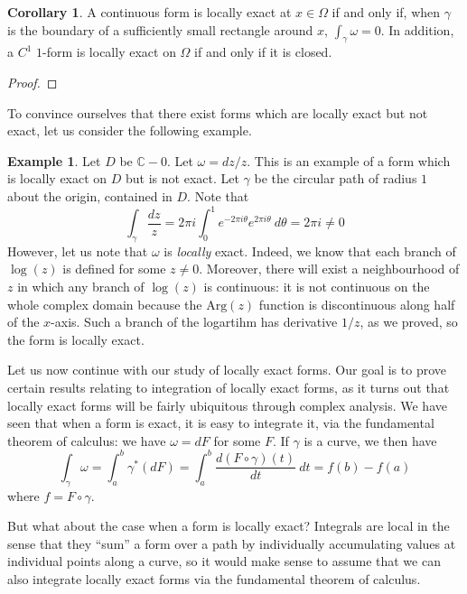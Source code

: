 \documentclass[aps,pra,showpacs,notitlepage,onecolumn,superscriptaddress,nofootinbib]{revtex4-1}
\theoremstyle{definition}
\newtheorem{corollary}{Corollary}[theorem]
\newtheorem{example}{Example}[section]
\begin{document}
\begin{corollary}
  A continuous form is locally exact at $x \in \Omega$ if and only if, when $\gamma$ is the boundary of a sufficiently small rectangle around $x$,
  $\int_{\gamma} \omega = 0$. In addition, a $C^1$ $1$-form is locally exact on $\Omega$ if and only if it is closed.
\end{corollary}
\begin{proof}
\end{proof}

\noindent To convince ourselves that there exist forms which are locally exact but not exact, let us consider the following example.

\begin{example}
  Let $D$ be $\mathbb{C} - 0$. Let $\omega = dz/z$. This is an example of a form which is locally exact on $D$ but is not exact.
  Let $\gamma$ be the circular path of radius $1$ about the origin, contained in $D$. Note that
  \begin{equation}
    \displaystyle\int_{\gamma} \frac{dz}{z} = 2 \pi i \displaystyle\int_{0}^{1} e^{-2 \pi i \theta} e^{2 \pi i \theta} \ d\theta = 2 \pi i \neq 0
  \end{equation}
  However, let us note that $\omega$ is \emph{locally} exact. Indeed, we know that each branch of $\log(z)$ is defined for some $z \neq 0$.
  Moreover, there will exist a neighbourhood of $z$ in which any branch of $\log(z)$ is continuous: it is not continuous on the whole complex domain
  because the $\text{Arg}(z)$ function is discontinuous along half of the $x$-axis. Such a branch of the logartihm has derivative $1/z$, as we proved, so
  the form is locally exact.
\end{example}

\noindent Let us now continue with our study of locally exact forms. Our goal is to prove certain results relating to integration of locally exact forms, as it turns
out that locally exact forms will be fairly ubiquitous through complex analysis. We have seen that when a form is exact, it is easy to integrate it, via the fundamental theorem
of calculus: we have $\omega = dF$ for some $F$. If $\gamma$ is a curve, we then have
\begin{equation}
  \displaystyle\int_{\gamma} \omega = \displaystyle\int_{a}^{b} \gamma^{*}(dF) = \displaystyle\int_{a}^{b} \frac{d (F \circ \gamma)(t)}{dt} \ dt = f(b) - f(a)
\end{equation}
where $f = F \circ \gamma$.

But what about the case when a form is locally exact? Integrals are local in the sense that they ``sum'' a form over a path by individually accumulating values
at individual points along a curve, so it would make sense to assume that we can also integrate locally exact forms via the fundamental theorem of calculus.
\end{document}
